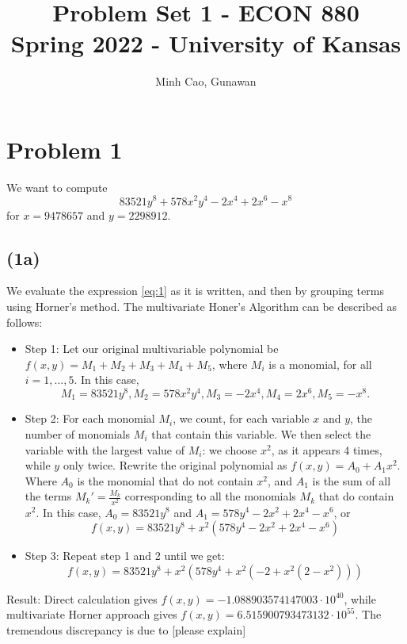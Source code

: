 \documentclass[11pt]{article}
\title{Problem Set 1 - ECON 880\\
	\small Spring 2022 - University of Kansas}
\author{Minh Cao, Gunawan}
\newcommand{\1}{\mathbbm{1}}
\begin{document}
\maketitle	
\section*{Problem 1}
We want to compute
\begin{equation}\label{eq:1}
	83521y^8 +578x^2 y^4 -2x^4 +2x^6 -x^8
\end{equation}
for $x = 9478657$ and $y = 2298912$.
\subsection*{(1a)}
We evaluate the expression \eqref{eq:1} as it is written, and then by grouping terms using Horner's method. The multivariate Honer's Algorithm can be described as follows:\\
\begin{itemize}
\item Step 1: Let our original multivariable polynomial be $f(x,y) = M_{1} +M_{2}+M_{3}+M_{4}+M_{5}$, where $M_{i}$ is a monomial, for all $i=1,\ldots,5$. In this case, 
\[M_{1} = 83521y^{8}, M_{2} = 578x^{2}y^{4}, M_{3}= -2x^{4}, M_{4}=2x^{6}, M_{5} = -x^{8}.\]
\item Step 2: For each monomial $M_{i}$, we count, for each variable $x$ and $y$, the number of monomials $M_{i}$ that contain this variable. We then select the variable with the largest value of $M_{i}$: we choose $x^2$, as it appears 4 times, while $y$ only twice. Rewrite the original polynomial as $f(x,y) = A_{0}+A_{1}x^2$. Where $A_{0}$ is the monomial that do not contain $x^2$, and $A_{1}$ is the sum of all the terms ${M_{k}}' = \frac{M_{k}}{x^2} $ corresponding to all the monomials $M_{k}$ that do contain $x^2$. In this case, $A_{0} = 83521y^8$ and $A_{1} = 578y^{4} - 2x^2+2x^{4}-x^{6}$, or
\[f(x,y) = 83521y^8 +x^2(578y^{4} - 2x^{2}+2x^{4}-x^{6}) \]

\item Step 3: Repeat step 1 and 2 until we get:
\[f(x,y) = 83521y^8 +x^{2} (578y^{4} +x^{2}(-2+x^{2}(2-x^2)))\]
\end{itemize}

Result: Direct calculation gives $f(x,y) = -1.088903574147003\cdot 10^{40}$, while multivariate Horner approach gives $f(x,y) = 6.515900793473132\cdot 10^{55}$. The tremendous discrepancy is due to [please explain] 
\end{document}
